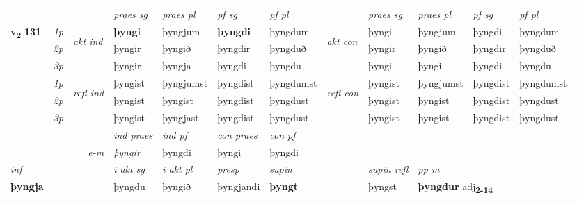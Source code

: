\begin{longtable}[l]{X>{\footnotesize\itshape}llXXXXlXXXX}
 & &   & \textit{praes sg}  & \textit{praes pl}    & \textit{ pf sg} & \textit{pf pl} & & \textit{praes sg}  & \textit{praes pl}    & \textit{pf sg} & \textit{pf pl }  \\ \cmidrule{4-7} \cmidrule{9-12}
 \multirow{2}{*}{{{\textbf{v{\textsubscript{2}}} \Large{\textbf{131}}}}}  & 1p & \multirow{3}{*}{\begin{turn}{90}\textit{akt ind}\end{turn}} & \textbf{þyngi} & þyngjum & \textbf{þyngdi} & þyngdum & \multirow{3}{*}{\begin{turn}{90}\textit{akt con}\end{turn}} &þyngi & þyngjum & þyngdi & þyngdum\\*
 & 2p &  &  þyngir  & þyngið & þyngdir & þyngduð & & þyngir & þyngið & þyngdir & þyngduð \\*
 & 3p &  & þyngir & þyngja & þyngdi & þyngdu & & þyngi & þyngi& þyngdi & þyngdu \\*
\cmidrule{4-7} \cmidrule{9-12}
 & 1p & \multirow{3}{*}{\begin{turn}{90}\textit{refl ind}\end{turn}}  & þyngist & þyngjumst & þyngdist & þyngdumst & \multirow{3}{*}{\begin{turn}{90}\textit{refl con}\end{turn}}  &þyngist & þyngjumst & þyngdist & þyngdumst \\*
 & 2p &  & þyngist & þyngist & þyngdist & þyngdust & &þyngist & þyngist & þyngdist & þyngdust \\*
 & 3p  & & þyngist & þyngjast & þyngdist & þyngdust & & þyngist & þyngist& þyngdist & þyngdust \\*
\cmidrule{4-7} \cmidrule{9-12}

   && &  \textit{ind praes} & \textit{ind pf} & \textit{con praes} & \textit{con pf} \\*
\multicolumn{3}{r}{\textit{e-m}} & þyngir & þyngdi & þyngi & þyngdi \\*

\cmidrule{4-7}
   {\textit{inf}} & &  & \textit{i akt sg} & \textit{i akt pl}   & \textit{presp} & \textit{supin} && \textit{supin refl} & \textit{pp m} \\*
  {\textbf{þyngja}} & && þyngdu  & þyngið   & þyngjandi &  \textbf{þyngt} && þyngst & \multicolumn{2}{l}{\textbf{þyngdur} adj\textbf{\textsubscript{2-14}}} \\*

\midrule


\end{longtable}
